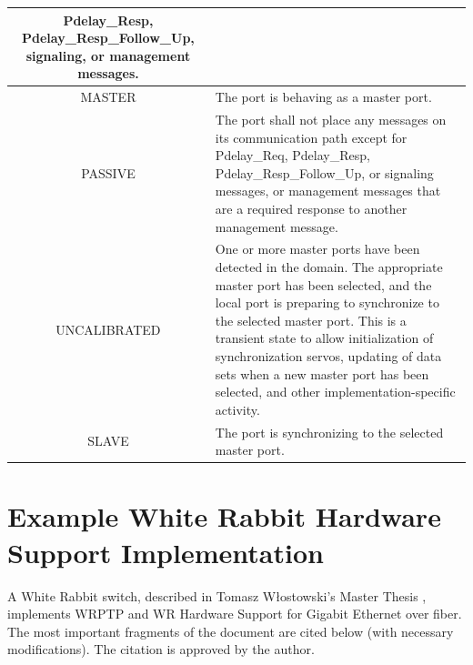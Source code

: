 \documentclass[a4paper, 12pt]{article}
\begin{document}
\begin{table}[hp!]
\begin{tabular}{| c | p{9.5cm} |}
		      Pdelay\_Resp,
		      Pdelay\_Resp\_Follow\_Up, signaling, or management messages.  \\ \hline
MASTER             &  \small The port is behaving as a master port.   \\ \hline
PASSIVE            &  \small The port shall not place any messages on its communication path except 
		      for Pdelay\_Req,
		      Pdelay\_Resp, Pdelay\_Resp\_Follow\_Up, or signaling messages, or management
		      messages that
		      are a required response to another management message.\\ \hline
UNCALIBRATED       &  \small One or more master ports have been detected in the domain. The 
		      appropriate master port has
		      been selected, and the local port is preparing to synchronize to the selected 
		      master port. This is a
		      transient state to allow initialization of synchronization servos, updating of
		      data sets when a new
		      master port has been selected, and other implementation-specific activity.   
		      \\ \hline
SLAVE              &  \small The port is synchronizing to the selected master port.  \\ \hline
\end{tabular}
\label{tab:ptp_port_state_def}
\end{table}


\newpage

\section{Example White Rabbit Hardware Support Implementation}
\label{sec:sampleHW}


A White Rabbit switch, described in Tomasz W\l{}ostowski's Master Thesis \cite{tomekMSC}, 
implements WRPTP and WR Hardware Support for Gigabit Ethernet over fiber. 
The most important fragments of the document are cited below (with necessary modifications).
The citation is approved by the author.

% 
\end{document}
